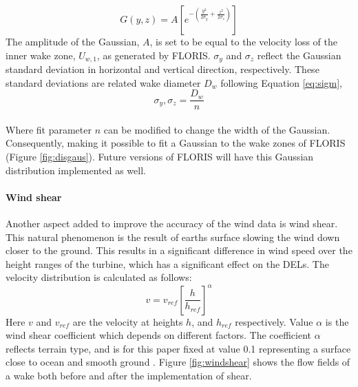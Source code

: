\begin{equation}
\label{eq:gaus}
G(y, z) = A [e^{-(\frac{y^2}{2\sigma_y} + \frac{z^2}{2\sigma_z})}]
\end{equation}
The amplitude of the Gaussian, $A$, is set to be equal to the velocity loss of the inner wake zone, $U_{w,1}$, as generated by FLORIS. $\sigma_y$ and $\sigma_z$ reflect the Gaussian standard deviation in horizontal and vertical direction, respectively. These standard deviations are related wake diameter $D_{w}$ following Equation \ref{eq:sigm},
\begin{equation}
\label{eq:sigm}
\sigma_y,\sigma_z = \frac{D_{w}}{n} 
\end{equation}
\\
Where fit parameter $n$ can be modified to change the width of the Gaussian. Consequently, making it possible to fit a Gaussian to the wake zones of FLORIS (Figure \ref{fig:disgaus}). Future versions of FLORIS will have this Gaussian distribution implemented as well. 

\paragraph{Wind shear} \label{sec:windshear}
Another aspect added to improve the accuracy of the wind data is wind shear. This natural phenomenon is the result of earths surface slowing the wind down closer to the ground. This results in a significant difference in wind speed over the height ranges of the turbine, which has a significant effect on the DELs\cite{Firtin2011}.  The velocity distribution is calculated as follows: 
\begin{equation}
\label{eq:shear}
v = v_{ref} \left[\frac{h}{h_{ref}}\right]^\alpha
\end{equation}
Here $v$ and $v_{ref}$ are the velocity at heights $h$, and $h_{ref}$  respectively. Value $\alpha$ is the wind shear coefficient which depends on different factors. The coefficient $\alpha$  reflects terrain type, and is for this paper fixed at value 0.1 representing a surface close to ocean and smooth ground \cite{Firtin2011}. Figure \ref{fig:windshear} shows the flow fields of a wake both before and after the implementation of shear.


